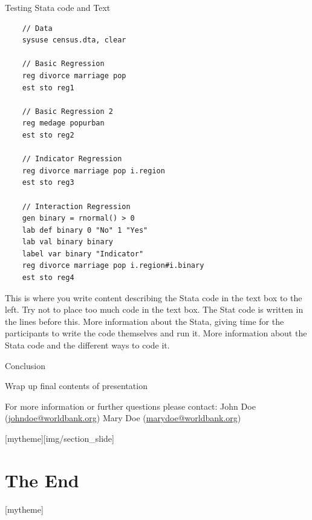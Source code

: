 \documentclass[aspectratio=169]{beamer}
\newcommand{\sectionpic}[2]{
	\setbeamertemplate{section page}[mytheme][#2]
	\section{#1}
	\setbeamertemplate{section page}[mytheme]
}
\begin{document}
\begin{frame}[fragile]{Testing Stata code and Text}
\begin{multicols}{2}
	\begin{lstlisting}
	// Data
	sysuse census.dta, clear
	
	// Basic Regression
	reg divorce marriage pop
	est sto reg1
	
	// Basic Regression 2
	reg medage popurban
	est sto reg2
	
	// Indicator Regression
	reg divorce marriage pop i.region
	est sto reg3
	
	// Interaction Regression
	gen binary = rnormal() > 0
	lab def binary 0 "No" 1 "Yes"
	lab val binary binary
	label var binary "Indicator"
	reg divorce marriage pop i.region#i.binary
	est sto reg4
	\end{lstlisting}
	\parbox{\linewidth}{
		This is where you write content describing the Stata code in the text box to the left. Try not to place too much code in the text box. The Stat code is written in the lines before this.
		\newline \newline
		More information about the Stata, giving time for the participants to write the code themselves and run it.
		\newline \newline
		More information about the Stata code and the different ways to code it.
	}
\end{multicols}
\end{frame}

\begin{frame}{Conclusion}

Wrap up final contents of presentation

\vspace{20mm}
For more information or further questions please contact:
\newline John Doe (\url{johndoe@worldbank.org}) \newline Mary Doe (\url{marydoe@worldbank.org})

\end{frame}

\sectionpic{The End}{img/section_slide}
\end{document}
